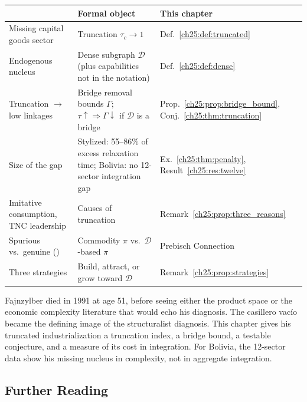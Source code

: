\documentclass[../structural_economics_book.tex]{subfiles}
\begin{document}
\begin{center}
\begin{tabularx}{\textwidth}{LLL}
\toprule
\textbf{\citet{fajnzylber1983industrializacion,fajnzylber1990industrializacion}} & \textbf{Formal object} & \textbf{This chapter} \\
\midrule
Missing capital goods sector & Truncation $\tau_c \to 1$ & Def.~\ref{ch25:def:truncated} \\
Endogenous nucleus & Dense subgraph $\mathcal{D}$ (plus capabilities not in the notation) & Def.~\ref{ch25:def:dense} \\
Truncation $\to$ low linkages & Bridge removal bounds $\Gamma$; $\tau \uparrow \Rightarrow \Gamma \downarrow$ if $\mathcal{D}$ is a bridge & Prop.~\ref{ch25:prop:bridge_bound}, Conj.~\ref{ch25:thm:truncation} \\
Size of the gap & Stylized: 55--86\% of excess relaxation time; Bolivia: no 12-sector integration gap & Ex.~\ref{ch25:thm:penalty}, Result~\ref{ch25:res:twelve} \\
Imitative consumption, TNC leadership & Causes of truncation & Remark~\ref{ch25:prop:three_reasons} \\
Spurious vs.\ genuine (\citeyear{fajnzylber1988competitividad}) & Commodity $\pi$ vs.\ $\mathcal{D}$-based $\pi$ & Prebisch Connection \\
Three strategies & Build, attract, or grow toward $\mathcal{D}$ & Remark~\ref{ch25:prop:strategies} \\
\bottomrule
\end{tabularx}
\end{center}

Fajnzylber died in 1991 at age 51, before seeing either the product space or the economic complexity literature that would echo his diagnosis. The casillero vac\'{i}o became the defining image of the structuralist diagnosis. This chapter gives his truncated industrialization a truncation index, a bridge bound, a testable conjecture, and a measure of its cost in integration. For Bolivia, the 12-sector data show his missing nucleus in complexity, not in aggregate integration.


\subsection*{Further Reading}
\end{document}
